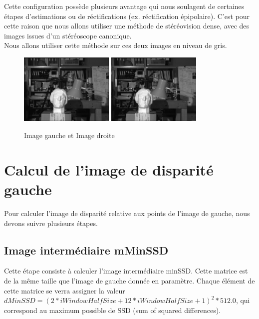 \documentclass[a4paper]{article}
\begin{document}
Cette configuration possède plusieurs avantage qui nous soulagent de certaines étapes d'estimations ou de réctifications (ex. réctification épipolaire). C'est pour cette raison que nous allons utiliser une méthode de stéréovision dense, avec des images issues d'un stéréoscope canonique.\\

Nous allons utiliser cette méthode sur ces deux images en niveau de gris.
\begin{figure}[h]
\begin{center}
\includegraphics[width=170px]{left.png}
\includegraphics[width=170px]{right.png}
\end{center}
\caption{Image gauche et Image droite}
\end{figure}

\clearpage

\section{Calcul de l'image de disparité gauche}
Pour calculer l'image de disparité relative aux points de l'image de gauche, nous devons suivre plusieurs étapes.

\subsection{Image intermédiaire mMinSSD}
Cette étape consiste à calculer l'image intermédiaire minSSD. Cette matrice est de la même taille que l'image de gauche donnée en paramètre.
Chaque élément de cette matrice se verra assigner la valeur $dMinSSD = (2 * iWindowHalfSize + 12 * iWindowHalfSize + 1)^2 * 512.0$, qui correspond au maximum possible de SSD (sum of squared differences).
\end{document}
